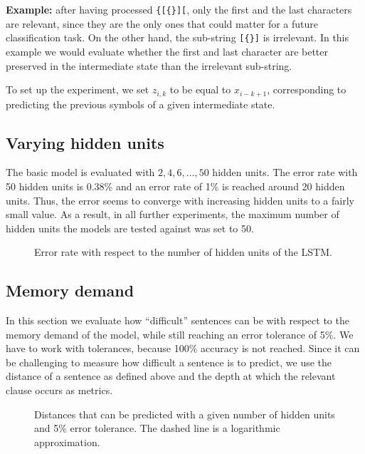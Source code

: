 \documentclass[11pt,a4paper]{article}
\newlength\figureheight
\newlength\figurewidth
\begin{document}
\textbf{Example:} after having processed \verb|{[{}][|, only the first and the last characters are relevant, since they are the only ones that could matter for a future classification task. On the other hand, the sub-string \verb|[{}]| is irrelevant. In this example we would evaluate whether the first and last character are better preserved in the intermediate state than the irrelevant sub-string.

To set up the experiment, we set $z_{i,k}$ to be equal to $x_{i-k+1}$, corresponding to predicting the previous symbols of a given intermediate state.

\subsection{Varying hidden units}
\label{subsec:varying_hidden_units}

The basic model is evaluated with $2,4,6,...,50$ hidden units. The error rate with 50 hidden units is 0.38\% and an error rate of 1\% is reached around 20 hidden units.  Thus, the error seems to converge with increasing hidden units to a fairly small value. As a result, in all further experiments, the maximum number of hidden units the models are tested against was set to 50.

\setlength\figureheight{4cm}
\setlength\figurewidth{\linewidth}
\begin{figure}[ht]
    \caption{Error rate with respect to the number of hidden units of the LSTM.}%
    \label{fig:varying_units_results}%
\end{figure}

\subsection{Memory demand}
\label{subsec:memory_demand}

In this section we evaluate how ``difficult'' sentences can be with respect to the memory demand of the model, while still reaching an error tolerance of 5\%. We have to work with tolerances, because 100\% accuracy is not reached. Since it can be challenging to measure how difficult a sentence is to predict, we use the distance of a sentence as defined above and the depth at which the relevant clause occurs as metrics.

\setlength\figureheight{5cm}
\setlength{}
\begin{figure*}[ht]
    \qquad
    
    \caption{Distances that can be predicted with a given number of hidden units and 5\% error tolerance. The dashed line is a logarithmic approximation.}%
    \label{fig:memory_demand}%
\end{figure*}
\end{document}
